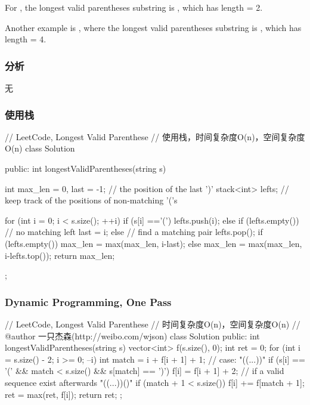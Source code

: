 For , the longest valid parentheses substring is , which has length = 2.

Another example is , where the longest valid parentheses substring is , which has length = 4.


\subsubsection{分析}
无


\subsubsection{使用栈}
\begin{Code}
	// LeetCode, Longest Valid Parenthese
	// 使用栈，时间复杂度O(n)，空间复杂度O(n)
	class Solution {
		public:
		int longestValidParentheses(string s) {
			int max_len = 0, last = -1; // the position of the last ')'
			stack<int> lefts;  // keep track of the positions of non-matching '('s
			
			for (int i = 0; i < s.size(); ++i) {
				if (s[i] =='(') {
					lefts.push(i);
				} else {
				if (lefts.empty()) {
					// no matching left
					last = i;
				} else {
				// find a matching pair
				lefts.pop();
				if (lefts.empty()) {
					max_len = max(max_len, i-last);
				} else {
				max_len = max(max_len, i-lefts.top());
			}
		}
	}
}
return max_len;
}
};
\end{Code}

\subsubsection{Dynamic Programming, One Pass}
\begin{Code}
	// LeetCode, Longest Valid Parenthese
	// 时间复杂度O(n)，空间复杂度O(n)
	// @author 一只杰森(http://weibo.com/wjson)
	class Solution {
		public:
		int longestValidParentheses(string s) {
			vector<int> f(s.size(), 0);
			int ret = 0;
			for (int i = s.size() - 2; i >= 0; --i) {
				int match = i + f[i + 1] + 1;
				// case: "((...))"
				if (s[i] == '(' && match < s.size() && s[match] == ')') {
					f[i] = f[i + 1] + 2;
					// if a valid sequence exist afterwards "((...))()"
					if (match + 1 < s.size()) f[i] += f[match + 1];
				}
				ret = max(ret, f[i]);
			}
			return ret;
		}
	};
\end{Code}


